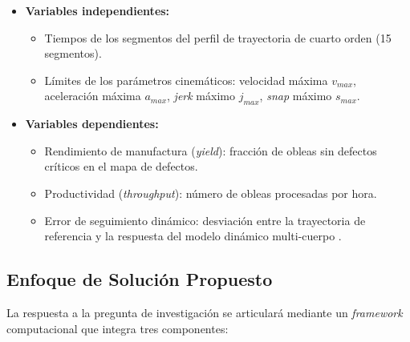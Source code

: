 \documentclass[11pt]{article}
\theoremstyle{definition}
\begin{document}
\begin{itemize}[leftmargin=1.5em]

\item \textbf{Variables independientes:}
\begin{itemize}
    \item Tiempos de los segmentos del perfil de trayectoria de cuarto orden (15 segmentos).
    \item Límites de los parámetros cinemáticos: velocidad máxima $v_{max}$, aceleración máxima $a_{max}$, \textit{jerk} máximo $j_{max}$, \textit{snap} máximo $s_{max}$.
\end{itemize}

\item \textbf{Variables dependientes:}
\begin{itemize}
    \item Rendimiento de manufactura (\textit{yield}): fracción de obleas sin defectos críticos en el mapa de defectos.
    \item Productividad (\textit{throughput}): número de obleas procesadas por hora.
    \item Error de seguimiento dinámico: desviación entre la trayectoria de referencia y la respuesta del modelo dinámico multi-cuerpo \supercite{Al-Rawashdeh2022_Caracterization}.
\end{itemize}

\end{itemize}

\subsection{Enfoque de Solución Propuesto}

La respuesta a la pregunta de investigación se articulará mediante un \textit{framework} computacional que integra tres componentes:
\end{document}
